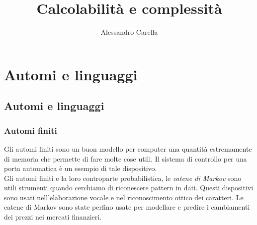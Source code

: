 \documentclass[12pt]{report}
\date{}
\author{Alessandro Carella}
\title{Calcolabilità e complessità}
\begin{document}
	{
		\let\cleardoublepage\clearpage
		\maketitle
		\tableofcontents
	}
	\part{Automi e linguaggi}
	\chapter{Automi e linguaggi}
	\section{Automi finiti}
	Gli automi finiti sono un buon modello per computer una quantità estremamente di memoria che permette di fare molte cose utili. Il sistema di controllo per una porta automatica è un esempio di tale dispositivo. \\
	Gli automi finiti e la loro controparte probabilistica, le \textit{catene di Markov} sono utili strumenti quando cerchiamo di riconescere pattern in dati. Questi dispositivi sono usati nell'elaborazione vocale e nel riconoscimento ottico dei caratteri. Le catene di Markov sono state perfino usate per modellare e predire i cambiamenti dei prezzi nei mercati finanzieri.
\end{document}
